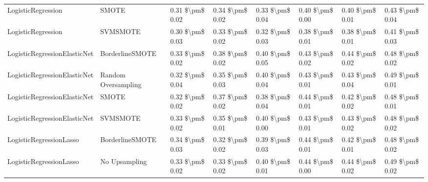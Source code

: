 \begin{tabular}{llllllll}
             LogisticRegression &                         SMOTE & 0.31 \$\textbackslash pm\$ 0.02 &           0.34 \$\textbackslash pm\$ 0.02 &       0.33 \$\textbackslash pm\$ 0.04 &        0.40 \$\textbackslash pm\$ 0.00 &                         0.40 \$\textbackslash pm\$ 0.01 &     0.43 \$\textbackslash pm\$ 0.04 \\
             LogisticRegression &                      SVMSMOTE & 0.30 \$\textbackslash pm\$ 0.03 &           0.33 \$\textbackslash pm\$ 0.02 &       0.32 \$\textbackslash pm\$ 0.03 &        0.38 \$\textbackslash pm\$ 0.01 &                         0.38 \$\textbackslash pm\$ 0.01 &     0.41 \$\textbackslash pm\$ 0.03 \\
   LogisticRegressionElasticNet &               BorderlineSMOTE & 0.33 \$\textbackslash pm\$ 0.02 &           0.38 \$\textbackslash pm\$ 0.02 &       0.40 \$\textbackslash pm\$ 0.05 &        0.43 \$\textbackslash pm\$ 0.02 &                         0.44 \$\textbackslash pm\$ 0.02 &     0.48 \$\textbackslash pm\$ 0.02 \\
   LogisticRegressionElasticNet &           Random Oversampling & 0.32 \$\textbackslash pm\$ 0.04 &           0.35 \$\textbackslash pm\$ 0.03 &       0.40 \$\textbackslash pm\$ 0.04 &        0.43 \$\textbackslash pm\$ 0.01 &                         0.43 \$\textbackslash pm\$ 0.04 &     0.49 \$\textbackslash pm\$ 0.01 \\
   LogisticRegressionElasticNet &                         SMOTE & 0.32 \$\textbackslash pm\$ 0.02 &           0.37 \$\textbackslash pm\$ 0.02 &       0.38 \$\textbackslash pm\$ 0.04 &        0.44 \$\textbackslash pm\$ 0.01 &                         0.42 \$\textbackslash pm\$ 0.02 &     0.48 \$\textbackslash pm\$ 0.01 \\
   LogisticRegressionElasticNet &                      SVMSMOTE & 0.33 \$\textbackslash pm\$ 0.02 &           0.35 \$\textbackslash pm\$ 0.01 &       0.40 \$\textbackslash pm\$ 0.00 &        0.43 \$\textbackslash pm\$ 0.01 &                         0.43 \$\textbackslash pm\$ 0.02 &     0.48 \$\textbackslash pm\$ 0.02 \\
        LogisticRegressionLasso &               BorderlineSMOTE & 0.34 \$\textbackslash pm\$ 0.03 &           0.32 \$\textbackslash pm\$ 0.02 &       0.39 \$\textbackslash pm\$ 0.03 &        0.44 \$\textbackslash pm\$ 0.01 &                         0.42 \$\textbackslash pm\$ 0.01 &     0.48 \$\textbackslash pm\$ 0.02 \\
        LogisticRegressionLasso &                 No Upsampling & 0.33 \$\textbackslash pm\$ 0.02 &           0.33 \$\textbackslash pm\$ 0.02 &       0.40 \$\textbackslash pm\$ 0.01 &        0.44 \$\textbackslash pm\$ 0.00 &                         0.44 \$\textbackslash pm\$ 0.02 &     0.49 \$\textbackslash pm\$ 0.02 \\

\end{tabular}
